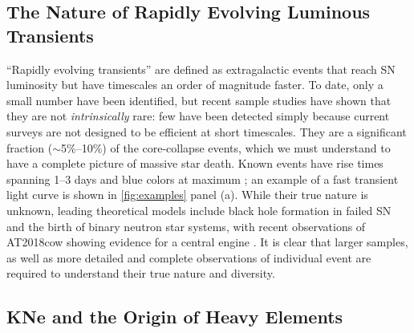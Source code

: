 \documentclass[letterpaper,longauthor,trackchanges,twocolumn,onecolappendix,sort&compress]{aastex62}
\begin{document}
\subsection{The Nature of Rapidly Evolving Luminous Transients} 

``Rapidly evolving transients'' are defined as extragalactic events that reach SN luminosity but have timescales an order of magnitude faster. To date, only a small number have been identified, but recent sample studies \citep{Drout2014} have shown that they are not \emph{intrinsically} rare: few have been detected simply because current surveys are not designed to be efficient at short timescales. They are a significant fraction ($\sim$5\%--10\%) of the core-collapse events, which we must understand to have a complete picture of massive star death. Known events have rise times spanning 1--3 days and blue colors at maximum \citep{Drout2014,Pirsiainen2018,Rest2018}; an example of a fast transient light curve is shown in \autoref{fig:examples} panel (a). While their true nature is unknown, leading theoretical models include black hole formation in failed SN and the birth of binary neutron star systems, with recent observations of AT2018cow showing evidence for a central engine \citep{Kashiyama2015,Margutti2018,Prentice2018}. 
It is clear that larger samples, as well as more detailed and complete observations of individual event are required to understand their true nature and diversity.


\subsection{KNe and the Origin of Heavy Elements} 
\end{document}

